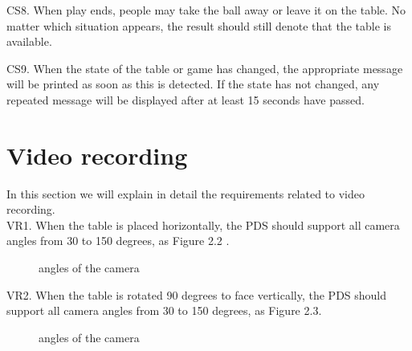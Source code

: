 \documentclass[11pt]{report}
\begin{document}
CS8. When play ends, people may take the ball away or leave it on the table. No matter which situation appears, the result should still denote that the table is available.

CS9. When the state of the table or game has changed, the appropriate message will be printed as soon as this is detected.  If the state has not changed, any repeated message will be displayed after at least 15 seconds have passed.

\section{Video recording}
In this section we will explain in detail the requirements related to video recording.\\

VR1. When the table is placed horizontally, the PDS should support all camera angles from 30 to 150 degrees, as Figure 2.2 .
\begin{figure}[!htb]
\centering
{}
\caption{ \small{ angles of the camera}}
\end{figure}

VR2. When the table is rotated 90 degrees to face vertically, the PDS should support all camera angles from 30 to 150 degrees, as Figure 2.3.
\begin{figure}[!htb]
\centering
{}
\caption{ \small{angles of the camera}}
\end{figure}
\end{document}
